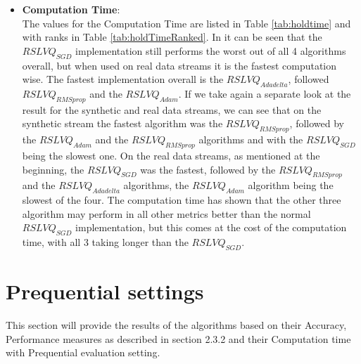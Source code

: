 \documentclass[12pt,oneside,a4paper,parskip]{scrbook}
\begin{document}
\begin{itemize}
  \item \textbf{Computation Time}: \\
        The values for the Computation Time are listed in Table \ref{tab:holdtime} and with ranks in Table \ref{tab:holdTimeRanked}.
        In it can be seen that the $RSLVQ_\textit{SGD}$ implementation still performs the worst out of all 4 algorithms overall,
        but when used on real data streams it is the fastest computation wise.
        The fastest implementation overall is the $RSLVQ_\textit{Adadelta}$, followed $RSLVQ_\textit{RMSprop}$ and the $RSLVQ_\textit{Adam}$.
        If we take again a separate look at the result for the synthetic and real data streams, we can see that on the synthetic stream the 
        fastest algorithm was the $RSLVQ_\textit{RMSprop}$, followed by the $RSLVQ_\textit{Adam}$ and the $RSLVQ_\textit{RMSprop}$ 
        algorithms and with the $RSLVQ_\textit{SGD}$ being the slowest one.
        On the real data streams, as mentioned at the beginning, the $RSLVQ_\textit{SGD}$ was the fastest, followed by the $RSLVQ_\textit{RMSprop}$ and
        the $RSLVQ_\textit{Adadelta}$ algorithms, the $RSLVQ_\textit{Adam}$ algorithm being the slowest of the four.
        The computation time has shown that the other three algorithm may perform in all other metrics better than the normal 
        $RSLVQ_\textit{SGD}$ implementation, but this comes at the cost of the computation time, with all 3 taking longer than the
        $RSLVQ_\textit{SGD}$.

\end{itemize}
\section{Prequential settings}
This section will provide the results of the algorithms based on their Accuracy, Performance measures as described in section 2.3.2
and their Computation time with Prequential evaluation setting.
\end{document}
